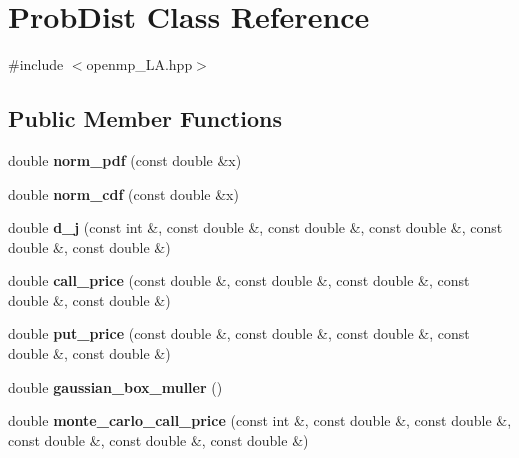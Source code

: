 \hypertarget{classProbDist}{}\section{Prob\+Dist Class Reference}
\label{classProbDist}


{\ttfamily \#include $<$openmp\+\_\+\+L\+A.\+hpp$>$}

\subsection*{Public Member Functions}
\begin{DoxyCompactItemize}
\item 
\mbox{\label{classProbDist_a13d09e11095574b1ad9f13fc2c465ba3}} 
double {\bfseries norm\+\_\+pdf} (const double \&x)
\item 
\mbox{\label{classProbDist_a36682e031a24ad12a12fc862d7255907}} 
double {\bfseries norm\+\_\+cdf} (const double \&x)
\item 
\mbox{\label{classProbDist_ace4aaaa131e238b5580b0c0997c1eb91}} 
double {\bfseries d\+\_\+j} (const int \&, const double \&, const double \&, const double \&, const double \&, const double \&)
\item 
\mbox{\label{classProbDist_a429dbe8c4d259e8432af9e277f04f824}} 
double {\bfseries call\+\_\+price} (const double \&, const double \&, const double \&, const double \&, const double \&)
\item 
\mbox{\label{classProbDist_aff1e433c9e4bc7b14c44dd06f070ee80}} 
double {\bfseries put\+\_\+price} (const double \&, const double \&, const double \&, const double \&, const double \&)
\item 
\mbox{\label{classProbDist_a6eafe4dfea02121acc319364c4a9ee4e}} 
double {\bfseries gaussian\+\_\+box\+\_\+muller} ()
\item 
\mbox{\label{classProbDist_a7573e31dafa264615a6c9119bb1371a2}} 
double {\bfseries monte\+\_\+carlo\+\_\+call\+\_\+price} (const int \&, const double \&, const double \&, const double \&, const double \&, const double \&)
\end{DoxyCompactItemize}


